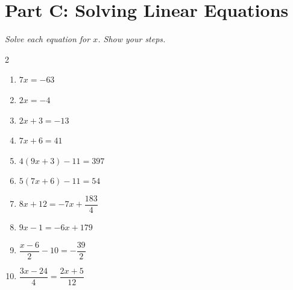 \documentclass[11pt]{article}
\begin{document}
\section*{Part C: Solving Linear Equations}
\noindent\textit{Solve each equation for $x$. Show your steps.}
\begin{multicols}{2}
\begin{enumerate}
  \item $7x = -63$
  \vspace{2.0cm}
  \item $2x = -4$
  \vspace{2.0cm}
  \item $2x + 3 = -13$
  \vspace{2.0cm}
  \item $7x + 6 = 41$
  \vspace{2.0cm}
  \item $4(9x + 3) - 11 = 397$
  \vspace{2.0cm}
  \item $5(7x + 6) - 11 = 54$
  \vspace{2.0cm}
  \item $8x + 12 = -7x + \dfrac{183}{4}$
  \vspace{2.0cm}
  \item $9x - 1 = -6x + 179$
  \vspace{2.0cm}
  \item $\dfrac{x - 6}{2} - 10 = -\dfrac{39}{2}$
  \vspace{2.0cm}
  \item $\dfrac{3x - 24}{4} = \dfrac{2x + 5}{12}$
  \vspace{2.0cm}
\end{enumerate}
\end{multicols}
\end{document}
